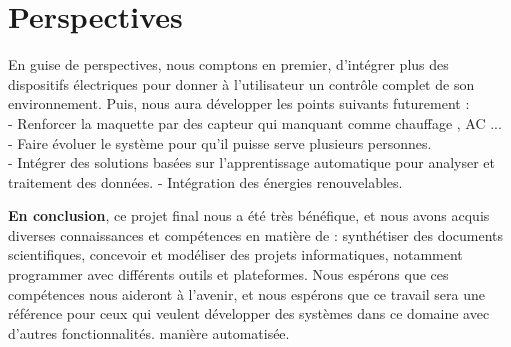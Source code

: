 \section*{Perspectives}
 En guise de perspectives, nous comptons en premier, d’intégrer plus des dispositifs électriques pour donner à l’utilisateur un contrôle complet de son environnement. Puis, nous aura développer les points suivants futurement :
 \\
 - Renforcer la maquette par des capteur qui manquant comme chauffage , AC ... 
 \\
 - Faire évoluer le système pour qu'il puisse serve plusieurs personnes.
 \\
 - Intégrer des solutions basées sur l'apprentissage automatique pour analyser et traitement des données.
 - Intégration des énergies renouvelables.
 \\
 \newline
 
\noindent
\textbf{En conclusion}, ce projet final nous a été très bénéfique, et nous avons acquis diverses connaissances et compétences en matière de : synthétiser des documents scientifiques, concevoir et modéliser des projets informatiques, notamment programmer avec différents outils et plateformes. Nous espérons que ces compétences nous aideront à l'avenir, et nous espérons que ce travail sera une référence pour ceux qui veulent développer des systèmes dans ce domaine avec d'autres fonctionnalités. 
manière automatisée.
